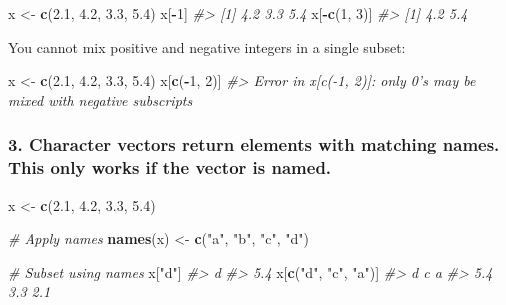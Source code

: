 \documentclass[
]{book}
\newenvironment{Shaded}{\begin{snugshade}}{\end{snugshade}}
\newcommand{\CommentTok}[1]{\textcolor[rgb]{0.56,0.35,0.01}{\textit{#1}}}
\newcommand{\DecValTok}[1]{\textcolor[rgb]{0.00,0.00,0.81}{#1}}
\newcommand{\FloatTok}[1]{\textcolor[rgb]{0.00,0.00,0.81}{#1}}
\newcommand{\KeywordTok}[1]{\textcolor[rgb]{0.13,0.29,0.53}{\textbf{#1}}}
\newcommand{\NormalTok}[1]{#1}
\newcommand{\OperatorTok}[1]{\textcolor[rgb]{0.81,0.36,0.00}{\textbf{#1}}}
\newcommand{\StringTok}[1]{\textcolor[rgb]{0.31,0.60,0.02}{#1}}
\begin{document}
\begin{Shaded}
\begin{Highlighting}[]
\NormalTok{x <-}\StringTok{ }\KeywordTok{c}\NormalTok{(}\FloatTok{2.1}\NormalTok{, }\FloatTok{4.2}\NormalTok{, }\FloatTok{3.3}\NormalTok{, }\FloatTok{5.4}\NormalTok{)}
\NormalTok{x[}\OperatorTok{-}\DecValTok{1}\NormalTok{]}
\CommentTok{#> [1] 4.2 3.3 5.4}
\NormalTok{x[}\OperatorTok{-}\KeywordTok{c}\NormalTok{(}\DecValTok{1}\NormalTok{, }\DecValTok{3}\NormalTok{)]}
\CommentTok{#> [1] 4.2 5.4}
\end{Highlighting}
\end{Shaded}

You cannot mix positive and negative integers in a single subset:

\begin{Shaded}
\begin{Highlighting}[]
\NormalTok{x <-}\StringTok{ }\KeywordTok{c}\NormalTok{(}\FloatTok{2.1}\NormalTok{, }\FloatTok{4.2}\NormalTok{, }\FloatTok{3.3}\NormalTok{, }\FloatTok{5.4}\NormalTok{)}
\NormalTok{x[}\KeywordTok{c}\NormalTok{(}\OperatorTok{-}\DecValTok{1}\NormalTok{, }\DecValTok{2}\NormalTok{)]}
\CommentTok{#> Error in x[c(-1, 2)]: only 0's may be mixed with negative subscripts}
\end{Highlighting}
\end{Shaded}

\hypertarget{character-vectors-return-elements-with-matching-names.-this-only-works-if-the-vector-is-named.}{%
\subsubsection*{\texorpdfstring{3. \textbf{Character vectors} return elements with matching names. This only works if the vector is named.}{3. Character vectors return elements with matching names. This only works if the vector is named.}}\label{character-vectors-return-elements-with-matching-names.-this-only-works-if-the-vector-is-named.}}

\begin{Shaded}
\begin{Highlighting}[]
\NormalTok{x <-}\StringTok{ }\KeywordTok{c}\NormalTok{(}\FloatTok{2.1}\NormalTok{, }\FloatTok{4.2}\NormalTok{, }\FloatTok{3.3}\NormalTok{, }\FloatTok{5.4}\NormalTok{)}

\CommentTok{# Apply names}
\KeywordTok{names}\NormalTok{(x) <-}\StringTok{ }\KeywordTok{c}\NormalTok{(}\StringTok{"a"}\NormalTok{, }\StringTok{"b"}\NormalTok{, }\StringTok{"c"}\NormalTok{, }\StringTok{"d"}\NormalTok{)}

\CommentTok{# Subset using names}
\NormalTok{x[}\StringTok{"d"}\NormalTok{]}
\CommentTok{#>   d }
\CommentTok{#> 5.4}
\NormalTok{x[}\KeywordTok{c}\NormalTok{(}\StringTok{"d"}\NormalTok{, }\StringTok{"c"}\NormalTok{, }\StringTok{"a"}\NormalTok{)]}
\CommentTok{#>   d   c   a }
\CommentTok{#> 5.4 3.3 2.1}
\end{Highlighting}
\end{Shaded}
\end{document}

